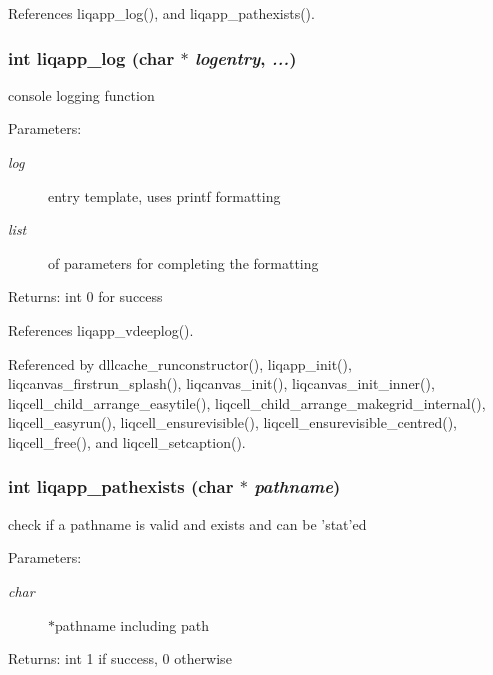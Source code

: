 References liqapp\_\-log(), and liqapp\_\-pathexists().
\subsubsection[{liqapp\_\-log}]{\setlength{\rightskip}{0pt plus 5cm}int liqapp\_\-log (char $\ast$ {\em logentry}, \/   {\em ...})}\label{d7/dbc/liqapp_8c_5949dc4f27ce46f833445707fce2c4c9}


console logging function \begin{Desc}
\item[Parameters:]
\begin{description}
\item[{\em log}]entry template, uses printf formatting \item[{\em list}]of parameters for completing the formatting \end{description}
\end{Desc}
\begin{Desc}
\item[Returns:]int 0 for success \end{Desc}


References liqapp\_\-vdeeplog().

Referenced by dllcache\_\-runconstructor(), liqapp\_\-init(), liqcanvas\_\-firstrun\_\-splash(), liqcanvas\_\-init(), liqcanvas\_\-init\_\-inner(), liqcell\_\-child\_\-arrange\_\-easytile(), liqcell\_\-child\_\-arrange\_\-makegrid\_\-internal(), liqcell\_\-easyrun(), liqcell\_\-ensurevisible(), liqcell\_\-ensurevisible\_\-centred(), liqcell\_\-free(), and liqcell\_\-setcaption().
\subsubsection[{liqapp\_\-pathexists}]{\setlength{\rightskip}{0pt plus 5cm}int liqapp\_\-pathexists (char $\ast$ {\em pathname})}\label{d7/dbc/liqapp_8c_7992d4b53d5c1e4c870e1c7d904ca7b8}


check if a pathname is valid and exists and can be 'stat'ed \begin{Desc}
\item[Parameters:]
\begin{description}
\item[{\em char}]$\ast$pathname including path \end{description}
\end{Desc}
\begin{Desc}
\item[Returns:]int 1 if success, 0 otherwise \end{Desc}


